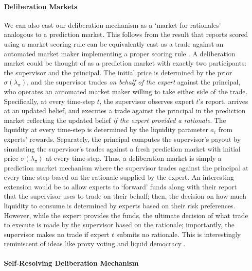 \documentclass{winnower}
\begin{document}
\paragraph{Deliberation Markets}

We can also cast our deliberation mechanism as a `market for rationales' analogous to a prediction market. This follows from the result that reports scored using a market scoring rule can be equivalently cast as a trade against an automated market maker implementing a proper scoring rule \citep{chen2012utility}. A deliberation market could be thought of as a prediction market with exactly two participants: the supervisor and the principal. The initial price is determined by the prior $\sigma(\lambda_\pi)$, and the supervisor trades \emph{on behalf of the expert} against the principal, who operates an automated market maker willing to take either side of the trade. Specifically, at every time-step $t$, the supervisor observes expert $t$'s report, arrives at an updated belief, and executes a trade against the principal in the prediction market reflecting the updated belief \emph{if the expert provided a rationale}. The liquidity at every time-step is determined by the liquidity parameter $a_t$ from experts' rewards. Separately, the principal computes the supervisor's payout by simulating the supervisor's trades against a fresh prediction market with initial price $\sigma(\lambda_\pi)$ at every time-step. Thus, a deliberation market is simply a prediction market mechanism where the supervisor trades against the principal at every time-step based on the rationale supplied by the expert. An interesting extension would be to allow experts to `forward' funds along with their report that the supervisor uses to trade on their behalf; then, the decision on how much liquidity to consume is determined by experts based on their risk preferences. However, while the expert provides the funds, the ultimate decision of what trade to execute is made by the supervisor based on the rationale; importantly, the supervisor makes no trade if expert $t$ submits no rationale. This is interestingly reminiscent of ideas like proxy voting and liquid democracy \citep{miller1969program, kahng2021liquid}.

\paragraph{Self-Resolving Deliberation Mechanism}
\end{document}
